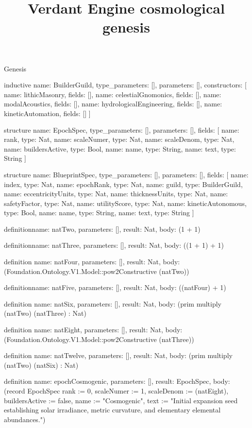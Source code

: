 \begin{lexlean}{Genesis}
\title{Verdant Engine cosmological genesis}
\begin{semanticmodule}
inductive{
  name: BuilderGuild,
  type_parameters: [],
  parameters: [],
  constructors: [
    {name: lithicMasonry, fields: []},
    {name: celestialGnomonics, fields: []},
    {name: modalAcoustics, fields: []},
    {name: hydrologicalEngineering, fields: []},
    {name: kineticAutomation, fields: []}
  ]
}

structure{
  name: EpochSpec,
  type_parameters: [],
  parameters: [],
  fields: [
    {name: rank, type: Nat},
    {name: scaleNumer, type: Nat},
    {name: scaleDenom, type: Nat},
    {name: buildersActive, type: Bool},
    {name: name, type: String},
    {name: text, type: String}
  ]
}

structure{
  name: BlueprintSpec,
  type_parameters: [],
  parameters: [],
  fields: [
    {name: index, type: Nat},
    {name: epochRank, type: Nat},
    {name: guild, type: BuilderGuild},
    {name: eccentricityUnits, type: Nat},
    {name: thicknessUnits, type: Nat},
    {name: safetyFactor, type: Nat},
    {name: utilityScore, type: Nat},
    {name: kineticAutonomous, type: Bool},
    {name: name, type: String},
    {name: text, type: String}
  ]
}

definition{name: natTwo, parameters: [], result: Nat, body: (1 + 1)}

definition{name: natThree, parameters: [], result: Nat, body: ((1 + 1) + 1)}

definition{
  name: natFour,
  parameters: [],
  result: Nat,
  body: (Foundation.Ontology.V1.Model::pow2Constructive (natTwo))
}

definition{name: natFive, parameters: [], result: Nat, body: ((natFour) + 1)}

definition{
  name: natSix,
  parameters: [],
  result: Nat,
  body: (prim multiply (natTwo) (natThree) : Nat)
}

definition{
  name: natEight,
  parameters: [],
  result: Nat,
  body: (Foundation.Ontology.V1.Model::pow2Constructive (natThree))
}

definition{
  name: natTwelve,
  parameters: [],
  result: Nat,
  body: (prim multiply (natTwo) (natSix) : Nat)
}

definition{
  name: epochCosmogenic,
  parameters: [],
  result: EpochSpec,
  body: (record EpochSpec {rank := 0, scaleNumer := 1, scaleDenom := (natEight), buildersActive := false, name := "Cosmogenic", text := "Initial expansion seed establishing solar irradiance, metric curvature, and elementary elemental abundances."})
}


\end{semanticmodule}
\end{lexlean}
